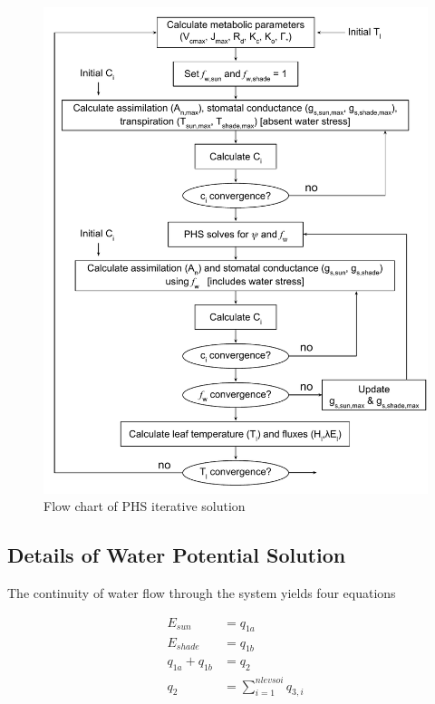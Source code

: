 \documentclass[draft,linenumbers]{agujournal}
\begin{document}
         \begin{figure}[h]
     \centering
     \includegraphics[width=30pc]{../figs3/schem3.pdf}
     \caption{Flow chart of PHS iterative solution}
     \label{flowchart}
  \end{figure}
          \clearpage

\subsection{Details of Water Potential Solution}


The continuity of water flow through the system yields four equations
   \begin{linenomath*} \begin{equation}
   \begin{aligned}
   E_{sun}&=q_{1a}\\
   E_{shade}&=q_{1b}\\
   q_{1a}+q_{1b}&=q_2\\
   q_2&=\sum_{i=1}^{nlevsoi}{q_{3,i}}
   \end{aligned}
   \end{equation} \end{linenomath*}
\end{document}
